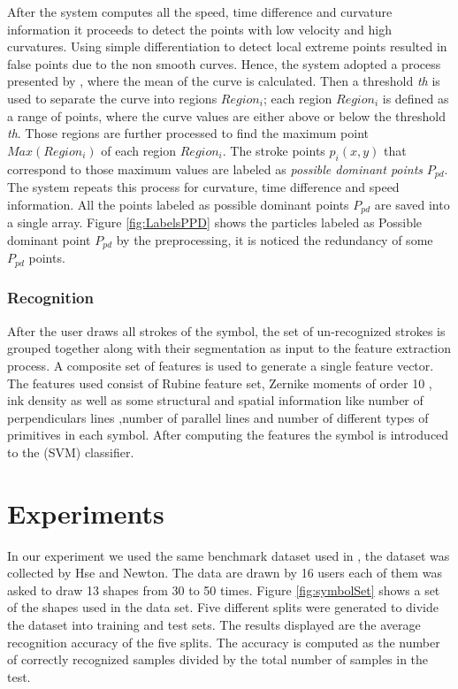 \documentclass[10pt]{article}
\begin{document}
After the system computes all the speed, time difference and curvature information it proceeds to detect the points with low velocity and high curvatures. Using simple differentiation to detect local extreme points resulted in false points due to the non smooth curves. Hence, the system adopted a process presented by \cite{earlyprocess}, where the mean of the curve is calculated. Then a threshold \textit{th} is used to separate the curve into regions $Region_i$; each region $Region_i$ is defined as a range of points, where the curve values are either above or below the threshold \textit{th}. Those regions are further processed to find the maximum point $Max(Region_i)$ of each region $Region_i$. The stroke points $p_i(x,y)$ that correspond to those maximum values are labeled as \textit{possible dominant points} $P_{pd}$. The system repeats this process for curvature, time difference and speed information. All the points labeled as possible dominant points $P_{pd}$ are saved into a single array. Figure \ref{fig:LabelsPPD} shows the particles labeled as Possible dominant point $P_{pd}$ by the preprocessing, it is noticed the redundancy of some $P_{pd}$ points. %
\subsubsection{Recognition}
\label{sec:Recognition}
After the user draws all strokes of the symbol, the set of un-recognized strokes is grouped together along with their segmentation as input to the feature extraction process. A composite set of features is used to generate a single feature vector. The features used consist of Rubine feature set,  Zernike moments of order 10 \cite{HeloiseBeautification}, ink density as well as some structural and spatial information like number of perpendiculars lines ,number of parallel lines and number of different types of primitives in each symbol. After computing the features the symbol is introduced to the (SVM) classifier. 

\cite{myPaper}  
\section{Experiments} 

In our experiment we used the same benchmark dataset used in \cite{myPaper}, the dataset was collected by Hse and Newton\cite{HeloiseBeautification}. The data are drawn by 16 users each of them was asked to draw 13 shapes from 30 to 50 times. Figure \ref{fig:symbolSet} shows a set of the shapes used in the data set. Five different splits were generated to divide the dataset into training and test sets. The results displayed are the average recognition accuracy of the five splits. The accuracy is computed as the number of correctly recognized samples divided by the total number of samples in the test.
	 
\end{document}
